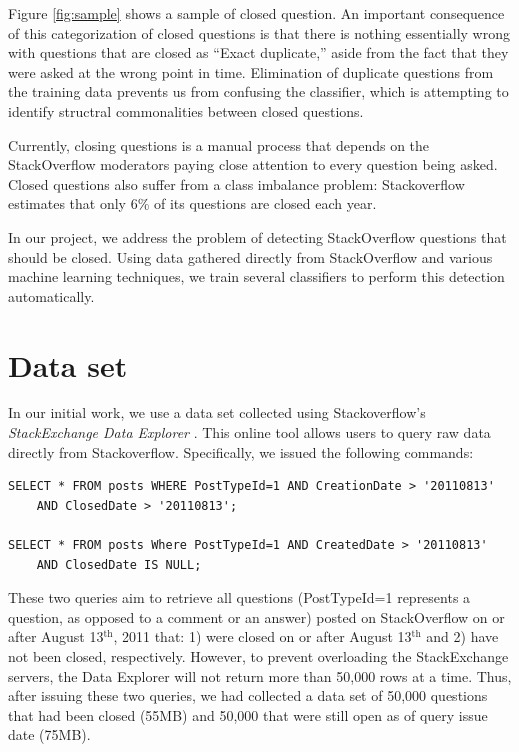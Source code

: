 \documentclass[11pt]{article}
\begin{document}
 Figure \ref{fig:sample} shows a sample of closed question. An important consequence of this categorization of closed questions is that there is nothing essentially wrong with questions that are closed as ``Exact duplicate,'' aside from the fact that they were asked at the wrong point in time. Elimination of duplicate questions from the training data prevents us from confusing the classifier, which is attempting to identify structral commonalities between closed questions.

 Currently, closing questions is a manual process that
depends on the StackOverflow moderators paying close attention to every
question being asked. Closed questions also suffer from a class imbalance problem:
Stackoverflow estimates that only 6\% of its questions are closed each
year.

 In our project, we address the problem of detecting StackOverflow
questions that should be closed.  Using data gathered directly from
StackOverflow and various machine learning techniques, we train several classifiers to perform this detection automatically.

\section{Data set}
In our initial work, we use a data set collected using
Stackoverflow's \emph{StackExchange Data Explorer}
\cite{website:stackexchange}. This online tool
allows users to query raw data directly from
Stackoverflow. Specifically, we issued the following commands:

\begin{verbatim}
SELECT * FROM posts WHERE PostTypeId=1 AND CreationDate > '20110813'
    AND ClosedDate > '20110813';

SELECT * FROM posts Where PostTypeId=1 AND CreatedDate > '20110813'
    AND ClosedDate IS NULL;
\end{verbatim}

These two queries aim to retrieve all questions (PostTypeId=1 represents a question, as opposed to a comment or an answer) posted on StackOverflow on or after August 13$^{\textrm{th}}$, 2011 that: 1)
were closed on or after August 13$^{\textrm{th}}$ and 2) have not been
closed, respectively.  However, to prevent overloading the StackExchange servers, the Data
Explorer will not return more than 50,000 rows at a time.  Thus, after
issuing these two queries, we had collected a data set of 50,000
questions that had been closed (55MB) and 50,000 that were still open as of
query issue date (75MB).
\end{document}
